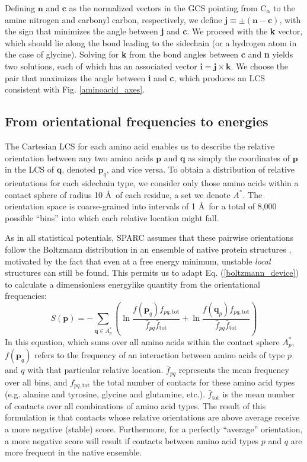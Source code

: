 \documentclass[11pt]{article}
\begin{document}
Defining $\textbf{n}$ and $\textbf{c}$ as the normalized vectors in the GCS pointing from C$_\alpha$ to the amine nitrogen and carbonyl carbon, respectively, we define $\textbf{j} \equiv \pm(\textbf{n} - \textbf{c})$, with the sign that minimizes the angle between \textbf{j} and \textbf{c}.
We proceed with the \textbf{k} vector, which should lie along the bond leading to the sidechain (or a hydrogen atom in the case of glycine).
Solving for \textbf{k} from the bond angles between \textbf{c} and \textbf{n} yields two solutions, each of which has an associated vector $\textbf{i}=\textbf{j}\times\textbf{k}$.
We choose the pair that maximizes the angle between \textbf{i} and \textbf{c}, which produces an LCS consistent with Fig. \ref{aminoacid_axes}.

\subsection{From orientational frequencies to energies}
The Cartesian LCS for each amino acid enables us to describe the relative orientation between any two amino acids $\textbf{p}$ and $\textbf{q}$ as simply the coordinates of $\textbf{p}$ in the LCS of $\textbf{q}$, denoted $\textbf{p}_q$, and vice versa.
To obtain a distribution of relative orientations for each sidechain type, we consider only those amino acids within a contact sphere of radius 10 \AA\, of each residue, a set we denote $A^*$.
The orientation space is coarse-grained into intervals of 1 \AA\, for a total of 8,000 possible ``bins'' into which each relative location might fall.

As in all statistical potentials, SPARC assumes that these pairwise orientations follow the Boltzmann distribution in an ensemble of native protein structures \cite{sippl}, motivated by the fact that even at a free energy minimum, unstable \textit{local} structures can still be found.
This permits us to adapt Eq. (\ref{boltzmann_device}) to calculate a dimensionless energylike quantity from the orientational frequencies:
\begin{equation}
\displaystyle
S(\textbf{p}) = -\sum_{\textbf{q}\in A_p^*} \left(\ln{\frac{f(\textbf{p}_q)f_{pq,\text{tot}}}{\bar{f}_{pq}\bar{f}_\text{tot}}} + \ln{\frac{f(\textbf{q}_p)f_{pq,\text{tot}}}{\bar{f}_{pq}\bar{f}_\text{tot}}}\right)
\label{sparc_equation}
\end{equation}
In this equation, which sums over all amino acids within the contact sphere $A_p^*$, $f(\textbf{p}_q)$ refers to the frequency of an interaction between amino acids of type $p$ and $q$ with that particular relative location. 
$\bar{f}_{pq}$ represents the mean frequency over all bins, and $f_{pq,\text{tot}}$ the total number of contacts for these amino acid types (e.g. alanine and tyrosine, glycine and glutamine, etc.).
$\bar{f}_\text{tot}$ is the mean number of contacts over all combinations of amino acid types.
The result of this formulation is that contacts whose relative orientations are above average receive a more negative (stable) score.
Furthermore, for a perfectly ``average'' orientation, a more negative score will result if contacts between amino acid types $p$ and $q$ are more frequent in the native ensemble.
\end{document}
